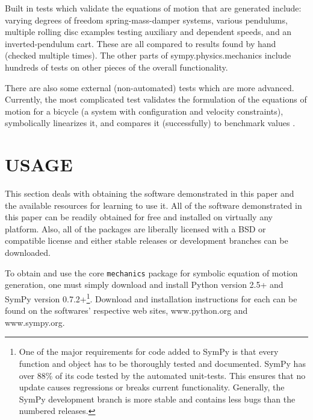 \documentclass[twocolumn,10pt]{asme2e}
\begin{document}
Built in tests which validate the equations of motion that are generated
include: varying degrees of freedom spring-mass-damper systems, various
pendulums, multiple rolling disc examples testing auxiliary and dependent
speeds, and an inverted-pendulum cart.
These are all compared to results found by hand (checked multiple times).
The other parts of sympy.physics.mechanics include hundreds of tests on other
pieces of the overall functionality.

There are also some external (non-automated) tests which are more advanced.
Currently, the most complicated test validates the formulation of the equations
of motion for a bicycle (a system with configuration and velocity constraints),
symbolically linearizes it, and compares it (successfully) to benchmark values
\cite{Meijaard2007}.

\section*{USAGE}
This section deals with obtaining the software demonstrated in this paper and
the available resources for learning to use it. All of the software
demonstrated in this paper can be readily obtained for free and installed on
virtually any platform. Also, all of the packages are liberally licensed with a
BSD or compatible license and either stable releases or development branches
can be downloaded.

To obtain and use the core \verb|mechanics| package for symbolic equation of
motion generation, one must simply download and install Python version 2.5+ and
SymPy version 0.7.2+\footnote{One of the major requirements for code added to
SymPy is that every function and object has to be thoroughly tested and
documented. SymPy has over 88\% of its code tested by the automated unit-tests.
This ensures that no update causes regressions or breaks current functionality.
Generally, the SymPy development branch is more stable and contains less bugs
than the numbered releases.}. Download and installation instructions for each
can be found on the softwares' respective web sites, www.python.org and
www.sympy.org.
\end{document}
